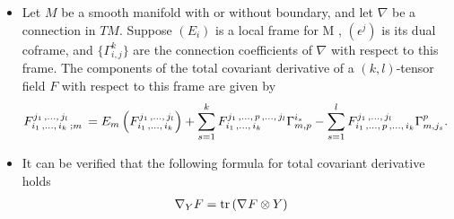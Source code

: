 \documentclass[11pt]{article}
\begin{document}
\begin{itemize}
\item \begin{proposition}
Let $M$ be a smooth manifold with or without boundary, and let $\nabla$ be a connection in $TM$. Suppose  $(E_i)$ is a local frame for M , $(\epsilon^j)$ is its dual coframe, and $\{\Gamma_{i,j}^{k}\}$ are the connection coefficients of $\nabla$ with respect to this frame. The components of the total covariant
derivative of a $(k,l)$-tensor field $F$ with respect to this frame are given by
\begin{align*}
F_{i_1 \,{,}\ldots{,}\, i_k\;;m}^{j_1 \,{,}\ldots{,}\, j_l}\,&=E_m\left(F_{i_1 \,{,}\ldots{,}\, i_k}^{j_1 \,{,}\ldots{,}\, j_l}\right)+ \sum_{s=1}^{k}F_{i_1 \,{,}\ldots{,}\, i_k}^{j_1 \,{,}\ldots{,}\, p \,{,}\ldots{,}\,  j_l}\Gamma_{m,p}^{i_s} -   \sum_{s=1}^{l}F_{i_1  \,{,}\ldots{,}\, p \,{,}\ldots{,}\, i_k}^{j_1 \,{,}\ldots{,}\,  j_l}\Gamma_{m, j_s}^{p}.
\end{align*}
\end{proposition}

\item \begin{remark} It can be verified that the following formula for total covariant derivative holds
\begin{align}
\nabla_{Y}{F} &= \text{tr}\left(\nabla_{}{F} \otimes Y\right) \label{eqn: total_covariant_trace}
\end{align}
\end{remark}
\end{itemize}
\end{document}
